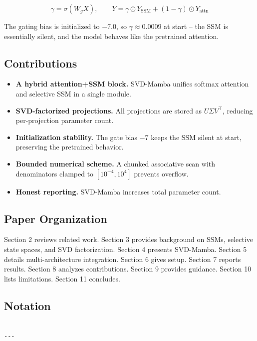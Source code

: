 \[
\gamma = \sigma(W_g X), \qquad
Y = \gamma \odot Y_\text{SSM} + (1 - \gamma) \odot Y_\text{attn}
\tag{1.3}
\]

The gating bias is initialized to $-7.0$, so $\gamma \approx 0.0009$ at 
start -- the SSM is essentially silent, and the model behaves like the 
pretrained attention.

\subsection{Contributions}

\begin{itemize}
\item \textbf{A hybrid attention+SSM block.} SVD-Mamba unifies softmax attention
  and selective SSM in a single module.
\item \textbf{SVD-factorized projections.} All projections are stored as
  $U \Sigma V^\top$, reducing per-projection parameter count.
\item \textbf{Initialization stability.} The gate bias $-7$ keeps the SSM silent
  at start, preserving the pretrained behavior.
\item \textbf{Bounded numerical scheme.} A chunked associative scan with
  denominators clamped to $[10^{-4}, 10^{4}]$ prevents overflow.
\item \textbf{Honest reporting.} SVD-Mamba increases total parameter count.

\end{itemize}
\subsection{Paper Organization}

Section 2 reviews related work. Section 3 provides background on SSMs, 
selective state spaces, and SVD factorization. Section 4 presents SVD-Mamba. 
Section 5 details multi-architecture integration. Section 6 gives setup. 
Section 7 reports results. Section 8 analyzes contributions. Section 9 
provides guidance. Section 10 lists limitations. Section 11 concludes.



\subsection{Notation}

\begin{lstlisting}

---
\end{lstlisting}